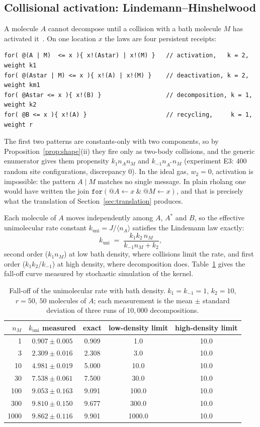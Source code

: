 \documentclass[11pt,a4paper]{article}
\theoremstyle{plain}
\theoremstyle{definition}
\theoremstyle{remark}
\newcommand{\code}[1]{\texttt{#1}}
\begin{document}
\subsection{Collisional activation: Lindemann--Hinshelwood}

A molecule $A$ cannot decompose until a collision with a bath molecule $M$
has activated it~\cite{Lindemann,Hinshelwood}. On one location $x$ the laws are
four persistent receipts:
\begin{lstlisting}
for( @(A | M)  <= x ){ x!(Astar) | x!(M) }   // activation,   k = 2, weight k1
for( @(Astar | M) <= x ){ x!(A) | x!(M) }    // deactivation, k = 2, weight km1
for( @Astar <= x ){ x!(B) }                  // decomposition, k = 1, weight k2
for( @B <= x ){ x!(A) }                      // recycling,     k = 1, weight r
\end{lstlisting}
The first two patterns are constants-only with two components, so by
Proposition~\ref{prop:shape}(ii) they fire only as two-body collisions, and the
generic enumerator gives them propensity $k_1n_An_M$ and $k_{-1}n_{A^*}n_M$
(experiment E3: $400$ random site configurations, discrepancy $0$). In the ideal
gas, $w_2=0$, activation is impossible: the pattern $A\mid M$ matches no single
message. In plain rholang one would have written the join
$\code{for}(@A\leftarrow x\ \&\ @M\leftarrow x)$, and that is precisely what the
translation of Section~\ref{sec:translation} produces.

Each molecule of $A$ moves independently among $A$, $A^*$ and $B$, so the
effective unimolecular rate constant $k_{\mathrm{uni}} = J/\langle n_A\rangle$
satisfies the Lindemann law exactly:
\[
k_{\mathrm{uni}} \;=\; \frac{k_1k_2\,n_M}{k_{-1}n_M + k_2},
\]
second order ($k_1n_M$) at low bath density, where collisions limit the rate,
and first order ($k_1k_2/k_{-1}$) at high density, where decomposition does.
Table~\ref{tab:lindemann} gives the fall-off curve measured by stochastic
simulation of the kernel.

\begin{table}[ht]
\centering
\begin{tabular}{rcccc}
\toprule
$n_M$ & $k_{\mathrm{uni}}$ measured & exact & low-density limit & high-density limit\\
\midrule
1 & $0.907\pm0.005$ & 0.909 & 1.0 & 10.0\\
3 & $2.309\pm0.016$ & 2.308 & 3.0 & 10.0\\
10 & $4.981\pm0.019$ & 5.000 & 10.0 & 10.0\\
30 & $7.538\pm0.061$ & 7.500 & 30.0 & 10.0\\
100 & $9.053\pm0.163$ & 9.091 & 100.0 & 10.0\\
300 & $9.810\pm0.150$ & 9.677 & 300.0 & 10.0\\
1000 & $9.862\pm0.116$ & 9.901 & 1000.0 & 10.0\\
\bottomrule
\end{tabular}
\caption{Fall-off of the unimolecular rate with bath density. $k_1=k_{-1}=1$,
$k_2=10$, $r=50$, $50$ molecules of $A$; each measurement is the mean $\pm$
standard deviation of three runs of $10{,}000$ decompositions.}
\label{tab:lindemann}
\end{table}
\end{document}
